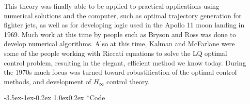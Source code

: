 \documentclass[11pt,letterpaper,onecolumn,notitlepage]{article}
\makeatletter
\newcommand{\codepath}{../include/code/hw1}
\renewcommand\section{\@startsection{section}{1}{\z@}%
{-3.5ex\@plus-1ex\@minus-0.2ex}%
{1.0ex\@plus0.2ex}%
{\fontsize{12pt}{12pt}\selectfont\bfseries\sffamily}}
\makeatother
\begin{document}
  This theory was finally able to be applied to practical applications using numerical solutions and the computer, such as optimal trajectory generation for fighter jets, as well as for developing logic used in the Apollo 11 moon landing in 1969.
  Much work at this time by people such as Bryson and Ross was done to develop numerical algorithms.
  Also at this time, Kalman and McFarlane were some of the people working with Riccati equations to solve the LQ optimal control problem, resulting in the elegant, efficient method we know today.
  During the 1970s much focus was turned toward robustification of the optimal control methods, and development of $H_{\infty}$ control theory.

  \clearpage
  \section*{Code}

  
  
  
  
  
  
  
  
  
\end{document}
